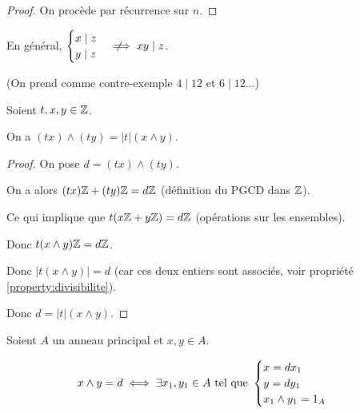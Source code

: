 \documentclass[12pt, a4paper]{report}
\begin{document}
\begin{proof}
    On procède par récurrence sur $n$.
\end{proof}

\begin{remark}
    En général, $\begin{cases}
    x\mid z\\y\mid z
    \end{cases} \;\not\!\!\!\implies xy \mid z$.

    (On prend comme contre-exemple $4\mid 12$ et $6\mid 12$...)
\end{remark}

\begin{property}
    Soient $t,x,y \in \mathbb{Z}$.

    On a $(tx)\wedge (ty) = |t| (x \wedge y)$.
\end{property}

\begin{proof}
    On pose $d=(tx)\wedge (ty)$.

    On a alors $(tx)\mathbb{Z} + (ty)\mathbb{Z} = d\mathbb{Z}$ (définition du PGCD dans $\mathbb{Z}$).

    Ce qui implique que $t(x\mathbb{Z} + y\mathbb{Z}) = d\mathbb{Z}$ (opérations sur les ensembles).

    Donc $t(x \wedge y)\mathbb{Z} = d\mathbb{Z}$.

    Donc $|t(x \wedge y)| = d$ (car ces deux entiers sont associés, voir propriété \ref{property:divisibilite}).

    Donc $d = |t| (x \wedge y)$.
\end{proof}

\begin{property}
    Soient $A$ un anneau principal et $x,y \in A$.

    $$x\wedge y = d \iff \exists x_1,y_1 \in A \text{ tel que } \begin{cases}
        x = dx_1\\
        y= dy_1\\
        x_1 \wedge y_1 = 1_A
    \end{cases}$$
\end{property}
\end{document}
